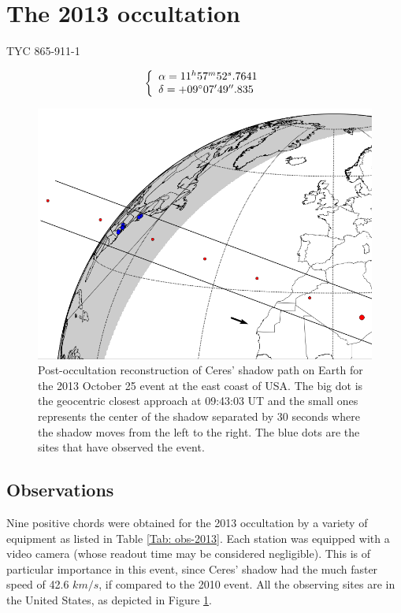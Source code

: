 \documentclass[useAMS,usenatbib]{mn2e}
\begin{document}
\section[]{The 2013 occultation}

TYC 865-911-1 

\begin{equation}
\left\{ 
  \begin{array}{l l}
    \alpha = 11^{h}57^{m}52^{s}.7641\\
    \delta = +09\hbox{$^\circ$} 07\hbox{$^\prime$} 49\hbox{$^{\prime\prime}$}.835
  \end{array}
\right.
\end{equation}

\begin{figure}
\includegraphics[scale=0.42]{figures/Ceres_2013.png} 
\caption{Post-occultation reconstruction of Ceres' shadow path on Earth for the 2013 October 25 event at the east coast of USA. The big dot is the geocentric closest approach at 09:43:03 UT and the small ones represents the center of the shadow separated by 30 seconds where the shadow moves from the left to the right.  The blue dots are the sites that have observed the event.\label{Fig: Ceres-2013-map}}
\end{figure}

\subsection{Observations}\label{Sec: observation-2013}

Nine positive chords were obtained for the 2013 occultation by a variety of equipment as listed in Table \ref{Tab: obs-2013}. Each station was equipped with a video camera (whose readout time may be considered negligible). This is of particular importance in this event, since Ceres' shadow had the much faster speed of 42.6 $km/s$, if compared to the 2010 event. All the observing sites are in the United States, as depicted in Figure \ref{Fig: Ceres-2013-map}.
\end{document}
